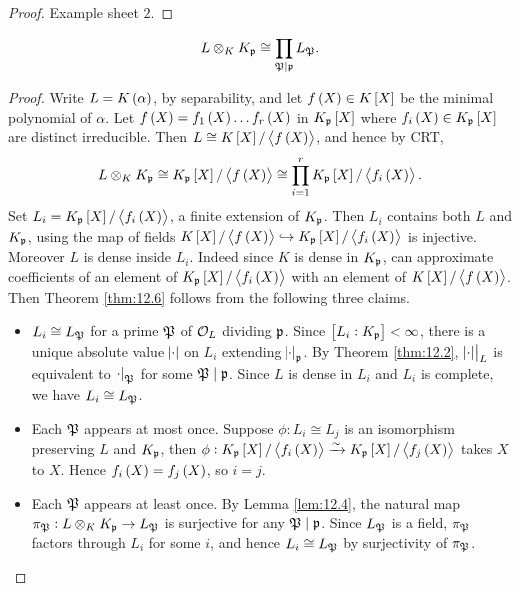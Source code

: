 \begin{proof}
Example sheet $ 2 $.
\end{proof}

\begin{theorem}
\label{thm:12.6}
$$ L \otimes_K K_{\mathfrak{p}} \cong \prod_{\mathfrak{P} \mid \mathfrak{p}} L_{\mathfrak{P}}. $$
\end{theorem}

\begin{proof}
Write $ L = K\br{\alpha} $, by separability, and let $ f\br{X} \in K\sbr{X} $ be the minimal polynomial of $ \alpha $. Let $ f\br{X} = f_1\br{X} \dots f_r\br{X} $ in $ K_\ppp\sbr{X} $ where $ f_i\br{X} \in K_\ppp\sbr{X} $ are distinct irreducible. Then $ L \cong K\sbr{X} / \abr{f\br{X}} $, and hence by CRT,
$$ L \otimes_K K_\ppp \cong K_\ppp\sbr{X} / \abr{f\br{X}} \cong \prod_{i = 1}^r K_\ppp\sbr{X} / \abr{f_i\br{X}}. $$
Set $ L_i = K_\ppp\sbr{X} / \abr{f_i\br{X}} $, a finite extension of $ K_{\mathfrak{p}} $. Then $ L_i $ contains both $ L $ and $ K_{\mathfrak{p}} $, using the map of fields $ K\sbr{X} / \abr{f\br{X}} \hookrightarrow K_\ppp\sbr{X} / \abr{f_i\br{X}} $ is injective. Moreover $ L $ is dense inside $ L_i $. Indeed since $ K $ is dense in $ K_{\mathfrak{p}} $, can approximate coefficients of an element of $ K_\ppp\sbr{X} / \abr{f_i\br{X}} $ with an element of $ K\sbr{X} / \abr{f\br{X}} $. Then Theorem \ref{thm:12.6} follows from the following three claims.
\begin{itemize}
\item $ L_i \cong L_{\mathfrak{P}} $ for a prime $ \mathfrak{P} $ of $ \mathcal{O}_L $ dividing $ \mathfrak{p} $. Since $ \sbr{L_i : K_\ppp} < \infty $, there is a unique absolute value $ \abs{\cdot} $ on $ L_i $ extending $ \abs{\cdot}_{\mathfrak{p}} $. By Theorem \ref{thm:12.2}, $ \left. \abs{\cdot} \right|_L $ is equivalent to $ \abs{\cdot}_{\mathfrak{P}} $ for some $ \mathfrak{P} \mid \mathfrak{p} $. Since $ L $ is dense in $ L_i $ and $ L_i $ is complete, we have $ L_i \cong L_{\mathfrak{P}} $.
\item Each $ \mathfrak{P} $ appears at most once. Suppose $ \phi : L_i \cong L_j $ is an isomorphism preserving $ L $ and $ K_{\mathfrak{p}} $, then $ \phi : K_\ppp\sbr{X} / \abr{f_i\br{X}} \xrightarrow{\sim} K_\ppp\sbr{X} / \abr{f_j\br{X}} $ takes $ X $ to $ X $. Hence $ f_i\br{X} = f_j\br{X} $, so $ i = j $.
\item Each $ \mathfrak{P} $ appears at least once. By Lemma \ref{lem:12.4}, the natural map $ \pi_{\mathfrak{P}} : L \otimes_K K_{\mathfrak{p}} \to L_{\mathfrak{P}} $ is surjective for any $ \mathfrak{P} \mid \mathfrak{p} $. Since $ L_{\mathfrak{P}} $ is a field, $ \pi_{\mathfrak{P}} $ factors through $ L_i $ for some $ i $, and hence $ L_i \cong L_{\mathfrak{P}} $ by surjectivity of $ \pi_{\mathfrak{P}} $.
\end{itemize}
\end{proof}

